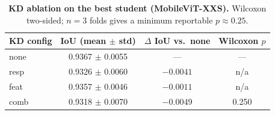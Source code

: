 \begin{table}[ht]
\centering
\caption{\textbf{KD ablation on the best student (MobileViT-XXS).} Wilcoxon two-sided; $n=3$ folds gives a minimum reportable $p \approx 0.25$.}
\label{tab:t3-kd-ablation}
\small
\begin{tabular}{lccc}
\toprule
\textbf{KD config} & \textbf{IoU (mean $\pm$ std)} & \textbf{$\Delta$ IoU vs.\ none} & \textbf{Wilcoxon $p$} \\
\midrule
none      & 0.9367 $\pm$ 0.0055 & ---      & --- \\
resp      & 0.9326 $\pm$ 0.0060 & $-0.0041$ & n/a \\
feat      & 0.9357 $\pm$ 0.0046 & $-0.0011$ & n/a \\
comb      & 0.9318 $\pm$ 0.0070 & $-0.0049$ & 0.250 \\
\bottomrule
\end{tabular}
\end{table}
